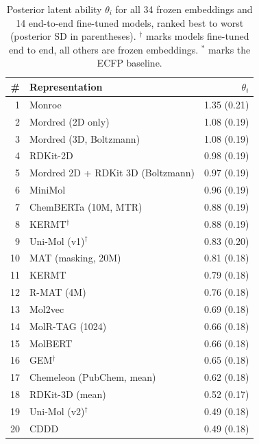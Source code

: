 \documentclass{article}
\begin{document}
\begin{table}[H]
\centering
\footnotesize
\setlength{\tabcolsep}{4pt}
\renewcommand{\arraystretch}{0.9}
\caption{Posterior latent ability $\theta_i$ for all 34 frozen embeddings and 14 end-to-end fine-tuned models, ranked
best to worst (posterior SD in parentheses). $^\dagger$ marks models
fine-tuned end to end, all others are frozen embeddings. $^\ast$ marks the ECFP
baseline.}
\label{tab:thetas}
\begin{tabular}[t]{@{}rlr@{}}
\toprule
\# & Representation & $\theta_i$ \\
\midrule
1  & Monroe                             & 1.35 (0.21) \\
2  & Mordred (2D only)                  & 1.08 (0.19) \\
3  & Mordred (3D, Boltzmann)            & 1.08 (0.19) \\
4  & RDKit-2D                           & 0.98 (0.19) \\
5  & Mordred 2D + RDKit 3D (Boltzmann)  & 0.97 (0.19) \\
6  & MiniMol                            & 0.96 (0.19) \\
7  & ChemBERTa (10M, MTR)               & 0.88 (0.19) \\
8  & KERMT$^\dagger$                    & 0.88 (0.19) \\
9  & Uni-Mol (v1)$^\dagger$             & 0.83 (0.20) \\
10 & MAT (masking, 20M)                 & 0.81 (0.18) \\
11 & KERMT                              & 0.79 (0.18) \\
12 & R-MAT (4M)                         & 0.76 (0.18) \\
13 & Mol2vec                            & 0.69 (0.18) \\
14 & MolR-TAG (1024)                    & 0.66 (0.18) \\
15 & MolBERT                            & 0.66 (0.18) \\
16 & GEM$^\dagger$                      & 0.65 (0.18) \\
17 & Chemeleon (PubChem, mean)          & 0.62 (0.18) \\
18 & RDKit-3D (mean)                    & 0.52 (0.17) \\
19 & Uni-Mol (v2)$^\dagger$             & 0.49 (0.18) \\
20 & CDDD                               & 0.49 (0.18) \\

\end{tabular}
\end{table}
\end{document}
